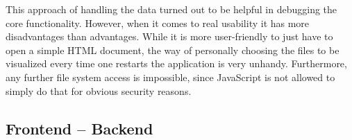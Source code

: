 This approach of handling the data turned out to be helpful in debugging the core functionality. However, when it comes to real usability it has more disadvantages than advantages. While it is more user-friendly to just have to open a simple HTML document, the way of personally choosing the files to be visualized every time one restarts the application is very unhandy. Furthermore, any further file system access is impossible, since JavaScript is not allowed to simply do that for obvious security reasons.
\subsection{Frontend -- Backend}